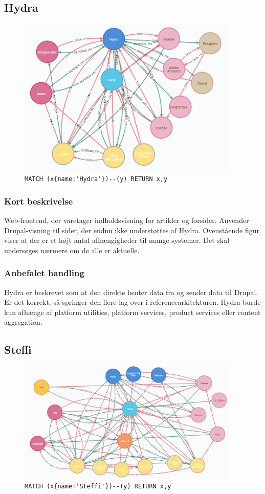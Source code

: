 \documentclass{article}
\begin{document}
\subsection{Hydra}
\begin{figure}[H]
\includegraphics[width=300pt]{Hydra.PNG}
\cprotect\caption{\verb|MATCH (x{name:'Hydra'})--(y) RETURN x,y|}
\end{figure}
\subsubsection*{Kort beskrivelse}
Web-frontend, der varetager indholdsvisning for artikler og forsider. Anvender Drupal-visning til sider, der endnu ikke understøttes af Hydra.
Ovenstående figur viser at der er et højt antal afhængigheder til mange systemer. Det skal undersøges nærmere om de alle er aktuelle.
\subsubsection*{Anbefalet handling}
Hydra er beskrevet som at den direkte henter data fra og sender data til Drupal. Er det korrekt, så springer den flere lag over i referencearkitekturen.
Hydra burde kun afhænge af platform utilities, platform services, product services eller content aggregation.



\subsection{Steffi}
\begin{figure}[H]
\includegraphics[width=300pt]{Steffi.PNG}
\cprotect\caption{\verb|MATCH (x{name:'Steffi'})--(y) RETURN x,y|}
\end{figure}
\end{document}
